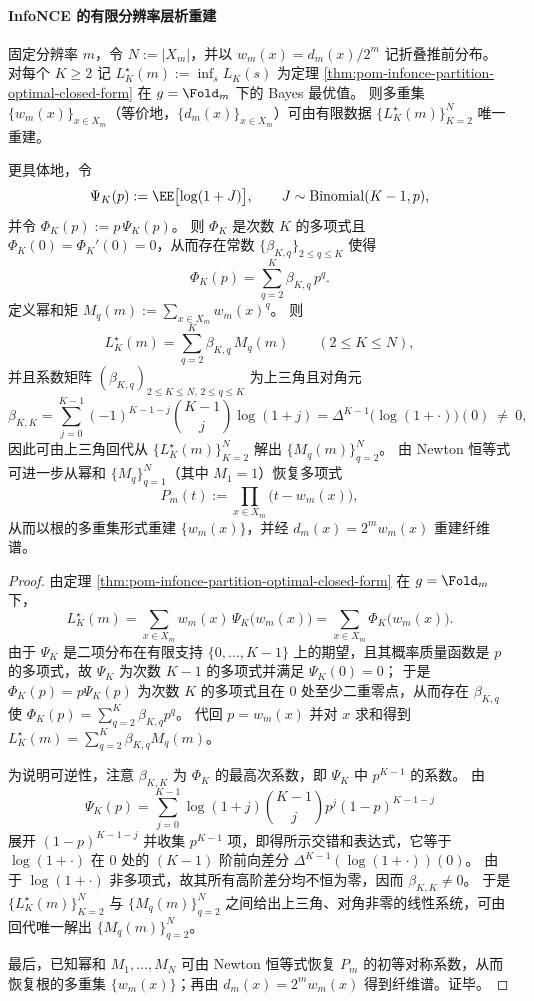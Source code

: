 \paragraph{InfoNCE 的有限分辨率层析重建}
\begin{theorem}\label{thm:pom-infonce-fiber-spectrum-tomography}
固定分辨率 \(m\)，令 \(N:=|X_m|\)，并以 \(w_m(x)=d_m(x)/2^m\) 记折叠推前分布。
对每个 \(K\ge 2\) 记
\(
L_K^\star(m):=\inf_s L_K(s)
\)
为定理 \ref{thm:pom-infonce-partition-optimal-closed-form} 在 \(g=\Fold_m\) 下的 Bayes 最优值。
则多重集 \(\{w_m(x)\}_{x\in X_m}\)（等价地，\(\{d_m(x)\}_{x\in X_m}\)）可由有限数据 \(\{L_K^\star(m)\}_{K=2}^{N}\) 唯一重建。
\par
更具体地，令
\[
\Psi_K(p):=\EE\bigl[\log(1+J)\bigr],\qquad J\sim\mathrm{Binomial}(K-1,p),
\]
并令 \(\Phi_K(p):=p\,\Psi_K(p)\)。
则 \(\Phi_K\) 是次数 \(K\) 的多项式且 \(\Phi_K(0)=\Phi_K'(0)=0\)，从而存在常数 \(\{\beta_{K,q}\}_{2\le q\le K}\) 使得
\[
\Phi_K(p)=\sum_{q=2}^{K}\beta_{K,q}\,p^q.
\]
定义幂和矩
\(
M_q(m):=\sum_{x\in X_m}w_m(x)^q
\)。
则
\[
L_K^\star(m)=\sum_{q=2}^{K}\beta_{K,q}\,M_q(m)\qquad(2\le K\le N),
\]
并且系数矩阵 \((\beta_{K,q})_{2\le K\le N,\,2\le q\le K}\) 为上三角且对角元
\[
\beta_{K,K}
=\sum_{j=0}^{K-1}(-1)^{K-1-j}\binom{K-1}{j}\log(1+j)
=\Delta^{K-1}\bigl(\log(1+\cdot)\bigr)(0)\ \neq\ 0,
\]
因此可由上三角回代从 \(\{L_K^\star(m)\}_{K=2}^{N}\) 解出 \(\{M_q(m)\}_{q=2}^{N}\)。
由 Newton 恒等式可进一步从幂和 \(\{M_q\}_{q=1}^{N}\)（其中 \(M_1=1\)）恢复多项式
\[
P_m(t):=\prod_{x\in X_m}\bigl(t-w_m(x)\bigr),
\]
从而以根的多重集形式重建 \(\{w_m(x)\}\)，并经 \(d_m(x)=2^m w_m(x)\) 重建纤维谱。
\end{theorem}
\begin{proof}
由定理 \ref{thm:pom-infonce-partition-optimal-closed-form} 在 \(g=\Fold_m\) 下，
\[
L_K^\star(m)=\sum_{x\in X_m}w_m(x)\,\Psi_K\!\bigl(w_m(x)\bigr)
=\sum_{x\in X_m}\Phi_K\!\bigl(w_m(x)\bigr).
\]
由于 \(\Psi_K\) 是二项分布在有限支持 \(\{0,\dots,K-1\}\) 上的期望，且其概率质量函数是 \(p\) 的多项式，故 \(\Psi_K\) 为次数 \(K-1\) 的多项式并满足 \(\Psi_K(0)=0\)；
于是 \(\Phi_K(p)=p\Psi_K(p)\) 为次数 \(K\) 的多项式且在 \(0\) 处至少二重零点，从而存在 \(\beta_{K,q}\) 使 \(\Phi_K(p)=\sum_{q=2}^{K}\beta_{K,q}p^q\)。
代回 \(p=w_m(x)\) 并对 \(x\) 求和得到
\(
L_K^\star(m)=\sum_{q=2}^{K}\beta_{K,q}M_q(m)
\)。
\par
为说明可逆性，注意 \(\beta_{K,K}\) 为 \(\Phi_K\) 的最高次系数，即 \(\Psi_K\) 中 \(p^{K-1}\) 的系数。
由
\[
\Psi_K(p)=\sum_{j=0}^{K-1}\log(1+j)\binom{K-1}{j}p^{j}(1-p)^{K-1-j}
\]
展开 \((1-p)^{K-1-j}\) 并收集 \(p^{K-1}\) 项，即得所示交错和表达式，它等于 \(\log(1+\cdot)\) 在 \(0\) 处的 \((K-1)\) 阶前向差分 \(\Delta^{K-1}(\log(1+\cdot))(0)\)。
由于 \(\log(1+\cdot)\) 非多项式，故其所有高阶差分均不恒为零，因而 \(\beta_{K,K}\neq 0\)。
于是 \(\{L_K^\star(m)\}_{K=2}^{N}\) 与 \(\{M_q(m)\}_{q=2}^{N}\) 之间给出上三角、对角非零的线性系统，可由回代唯一解出 \(\{M_q(m)\}_{q=2}^{N}\)。
\par
最后，已知幂和 \(M_1,\dots,M_N\) 可由 Newton 恒等式恢复 \(P_m\) 的初等对称系数，从而恢复根的多重集 \(\{w_m(x)\}\)；再由 \(d_m(x)=2^m w_m(x)\) 得到纤维谱。证毕。
\end{proof}


